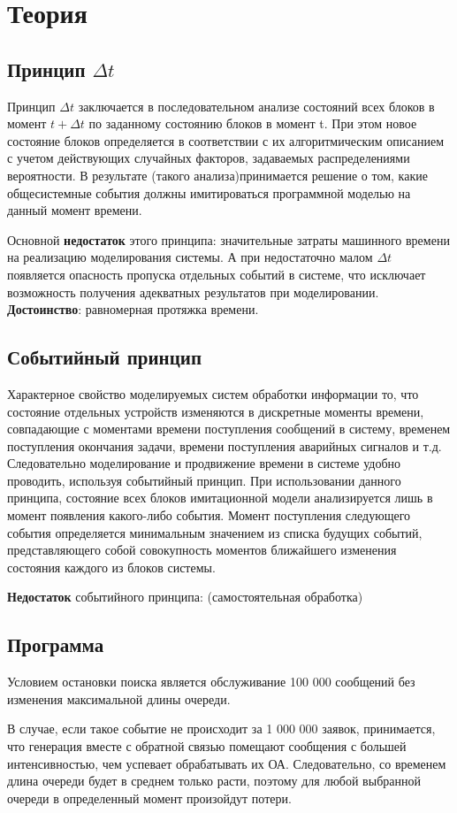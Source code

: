 \chapter{Теория}
\section{Принцип $\Delta t$}
Принцип $\Delta t$ заключается в последовательном анализе состояний всех блоков в момент $t + \Delta t$ по заданному состоянию блоков в момент t. При этом новое состояние блоков определяется в соответствии с их алгоритмическим описанием с учетом действующих случайных факторов, задаваемых распределениями вероятности. В результате (такого анализа)принимается решение о том, какие общесистемные события должны имитироваться программной моделью на данный момент времени.

Основной \textbf{недостаток} этого принципа: значительные затраты машинного времени на реализацию моделирования системы. А при недостаточно малом $\Delta t$ появляется опасность пропуска отдельных событий в системе, что исключает возможность получения адекватных результатов при моделировании. \textbf{Достоинство}: равномерная протяжка времени.

\section{Событийный принцип}
Характерное свойство моделируемых систем обработки информации то, что состояние отдельных устройств изменяются в дискретные моменты времени, совпадающие с моментами времени поступления сообщений в систему, временем поступления окончания задачи, времени поступления аварийных сигналов и т.д. Следовательно моделирование и продвижение времени в системе удобно проводить, используя событийный принцип. При использовании данного принципа, состояние всех блоков имитационной модели анализируется лишь в момент появления какого-либо события. Момент поступления следующего события определяется минимальным значением из списка будущих событий, представляющего собой совокупность моментов ближайшего изменения состояния каждого из блоков системы.

\textbf{Недостаток} событийного принципа: (самостоятельная обработка)

\section{Программа}
Условием остановки поиска является обслуживание 100 000 сообщений без изменения максимальной длины очереди.   

В случае, если такое событие не происходит за 1 000 000 заявок, принимается, что генерация вместе с обратной связью помещают сообщения с большей интенсивностью, чем успевает обрабатывать их ОА. Следовательно, со временем длина очереди будет в среднем только расти, поэтому для любой выбранной очереди в определенный момент произойдут потери.